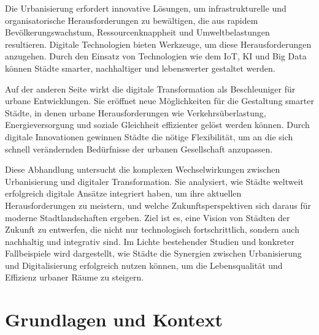 \documentclass[conference,compsoc,final,a4paper, onecolumn, 11pt]{IEEEtran}
\begin{document}
Die Urbanisierung erfordert innovative Lösungen, um infrastrukturelle und organisatorische Herausforderungen zu bewältigen, die aus rapidem Bevölkerungswachstum, Ressourcenknappheit und Umweltbelastungen resultieren. 
Digitale Technologien bieten Werkzeuge, um diese Herausforderungen anzugehen. Durch den Einsatz von Technologien wie dem \ac{IoT}, \ac{KI} und Big Data können Städte smarter, nachhaltiger und lebenswerter gestaltet werden.

Auf der anderen Seite wirkt die digitale Transformation als Beschleuniger für urbane Entwicklungen. 
Sie eröffnet neue Möglichkeiten für die Gestaltung smarter Städte, in denen urbane Herausforderungen wie Verkehrsüberlastung, Energieversorgung und soziale Gleichheit effizienter gelöst werden können. Durch digitale Innovationen gewinnen Städte die nötige Flexibilität, um an die sich schnell verändernden Bedürfnisse der urbanen Gesellschaft anzupassen.

Diese Abhandlung untersucht die komplexen Wechselwirkungen zwischen Urbanisierung und digitaler Transformation. 
Sie analysiert, wie Städte weltweit erfolgreich digitale Ansätze integriert haben, um ihre aktuellen Herausforderungen zu meistern, und welche Zukunftsperspektiven sich daraus für moderne Stadtlandschaften ergeben. 
Ziel ist es, eine Vision von Städten der Zukunft zu entwerfen, die nicht nur technologisch fortschrittlich, sondern auch nachhaltig und integrativ sind. 
Im Lichte bestehender Studien und konkreter Fallbeispiele wird dargestellt, wie Städte die Synergien zwischen Urbanisierung und Digitalisierung erfolgreich nutzen können, um die Lebensqualität und Effizienz urbaner Räume zu steigern.


\section{Grundlagen und Kontext}
\end{document}
